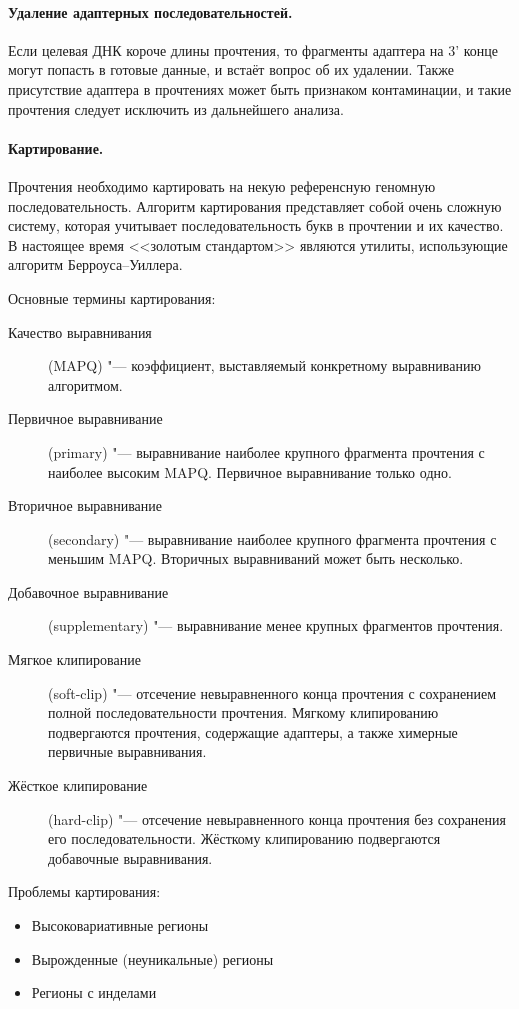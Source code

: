 \documentclass[a4paper,12pt]{article}
\begin{document}
\paragraph{Удаление адаптерных последовательностей.}
Если целевая ДНК короче длины прочтения, то фрагменты адаптера на 3' конце могут попасть в готовые данные, и встаёт вопрос об их удалении.
Также присутствие адаптера в прочтениях может быть признаком контаминации, и такие прочтения следует исключить из дальнейшего анализа\cite{cutadapt}.

\paragraph{Картирование.}
Прочтения необходимо картировать на некую референсную геномную последовательность.
Алгоритм картирования представляет собой очень сложную систему, которая учитывает последовательность букв в прочтении и их качество.
В настоящее время <<золотым стандартом>> являются утилиты, использующие алгоритм Берроуса--Уиллера\cite{burrows}.

Основные термины картирования:

\begin{description}
\item[Качество выравнивания] (MAPQ) "--- коэффициент, выставляемый конкретному выравниванию алгоритмом.
\item[Первичное выравнивание] (primary) "--- выравнивание наиболее крупного фрагмента прочтения с наиболее высоким MAPQ.
Первичное выравнивание только одно.
\item[Вторичное выравнивание] (secondary) "--- выравнивание наиболее крупного фрагмента прочтения с меньшим MAPQ.
Вторичных выравниваний может быть несколько.
\item[Добавочное выравнивание] (supplementary) "--- выравнивание менее крупных фрагментов прочтения.
\item[Мягкое клипирование] (soft-clip) "--- отсечение невыравненного конца прочтения с сохранением полной последовательности прочтения.
Мягкому клипированию подвергаются прочтения, содержащие адаптеры, а также химерные первичные выравнивания.
\item[Жёсткое клипирование] (hard-clip) "--- отсечение невыравненного конца прочтения без сохранения его последовательности.
Жёсткому клипированию подвергаются добавочные выравнивания.
\end{description}

Проблемы картирования:

\begin{itemize}
\item Высоковариативные регионы
\item Вырожденные (неуникальные) регионы
\item Регионы с инделами
\end{itemize}
\end{document}
